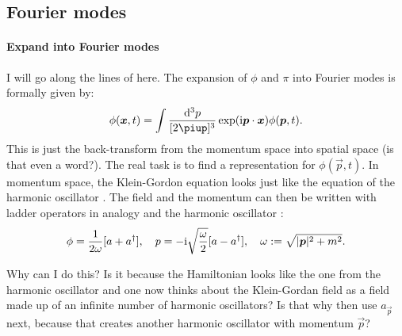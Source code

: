 \documentclass[11pt, english, fleqn, DIV=15, headinclude, BCOR=1cm]{scrartcl}
\begin{document}
\subsection{Fourier modes}

\paragraph{Expand into Fourier modes}

I will go along the lines of \textcite[§\,2.3]{Peskin/QFT/1995} here. The
expansion of $\phi$ and $\pi$ into Fourier modes is formally given by:
\begin{equation}
    \phi(\vec x, t) = \int \frac{\dif^3p}{[2\piup]^3} \exp(\iup \vec p \cdot \vec x)
    \phi(\vec p, t).
\end{equation}
This is just the back-transform from the momentum space into spatial space (is
that even a word?). The real task is to find a representation for $\phi(\vec p,
t)$. In momentum space, the Klein-Gordon equation looks just like the equation
of the harmonic oscillator \parencite[(2.21)]{Peskin/QFT/1995}. The field and
the momentum can then be written with ladder operators in analogy and the
harmonic oscillator
\parencite[(2.23)]{Peskin/QFT/1995}:
\begin{equation}
    \phi = \frac{1}{2 \omega} [a + a^\dagger]
    ,\quad
    p = - \mathrm i \sqrt{\frac{\omega}{2}} [a - a^\dagger]
    ,\quad
    \omega := \sqrt{|\boldsymbol{p}|^2 + m^2}.
\end{equation}

\begin{question}
    Why can I do this? Is it because the Hamiltonian looks like the one from
    the harmonic oscillator and one now thinks about the Klein-Gordan field as
    a field made up of an infinite number of harmonic oscillators? Is that why
    \textcite[(2.25)]{Peskin/QFT/1995} then use $a_{\vec p}$ next, because that
    creates another harmonic oscillator with momentum $\vec p$?
\end{question}
\end{document}
